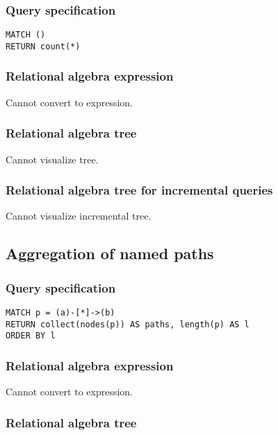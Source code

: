 \subsubsection*{Query specification}

\begin{lstlisting}
MATCH ()
RETURN count(*)
\end{lstlisting}

\subsubsection*{Relational algebra expression}

Cannot convert to expression.

\subsubsection*{Relational algebra tree}

Cannot visualize tree.

\subsubsection*{Relational algebra tree for incremental queries}

Cannot visualize incremental tree.

\subsection{Aggregation of named paths}

\subsubsection*{Query specification}

\begin{lstlisting}
MATCH p = (a)-[*]->(b)
RETURN collect(nodes(p)) AS paths, length(p) AS l
ORDER BY l
\end{lstlisting}

\subsubsection*{Relational algebra expression}

Cannot convert to expression.

\subsubsection*{Relational algebra tree}


